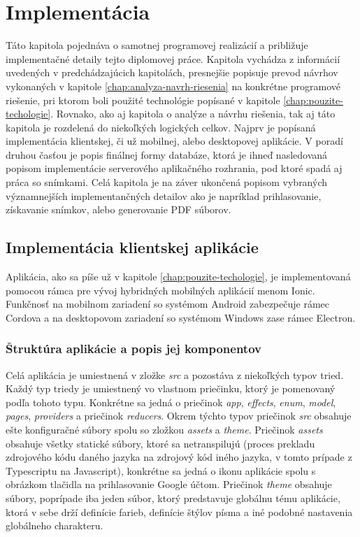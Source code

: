 \chapter{Implementácia}
\label{chap:implementacia}
Táto kapitola pojednáva o samotnej programovej realizácií a približuje implementačné detaily tejto diplomovej práce. Kapitola vychádza z informácií uvedených v predchádzajúcich kapitolách, presnejšie popisuje prevod návrhov vykonaných v kapitole \ref{chap:analyza-navrh-riesenia} na konkrétne programové riešenie, pri ktorom boli použité technológie popísané v kapitole \ref{chap:pouzite-techologie}.  Rovnako, ako aj kapitola o analýze a návrhu riešenia, tak aj táto kapitola je rozdelená do niekoľkých logických celkov. Najprv je popísaná implementácia klientskej, či už mobilnej, alebo desktopovej aplikácie. V poradí druhou časťou je popis finálnej formy databáze, ktorá je ihneď nasledovaná popisom implementácie serverového aplikačného rozhrania, pod ktoré  spadá aj práca so snímkami. Celá kapitola je na záver ukončená popisom vybraných významnejších implementančných detailov ako je napríklad prihlasovanie, získavanie snímkov, alebo generovanie PDF súborov.

\section{Implementácia klientskej aplikácie}
Aplikácia, ako sa píše už v kapitole \ref{chap:pouzite-techologie}, je implementovaná pomocou rámca pre vývoj hybridných mobilných aplikácií menom Ionic. Funkčnosť na mobilnom zariadení so systémom Android zabezpečuje rámec Cordova a na desktopovom zariadení so systémom Windows zase rámec Electron.

\subsection{Štruktúra aplikácie a popis jej komponentov}
Celá aplikácia je umiestnená v zložke \textit{src} a pozostáva z niekoľkých typov tried. Každý typ triedy je umiestnený vo vlastnom priečinku, ktorý je pomenovaný podľa tohoto typu. Konkrétne sa jedná o priečinok \textit{app}, \textit{effects}, \textit{enum}, \textit{model}, \textit{pages}, \textit{providers} a priečinok \textit{reducers}. Okrem týchto typov priečinok \textit{src} obsahuje ešte konfiguračné súbory spolu so zložkou \textit{assets} a \textit{theme}. Priečinok \textit{assets} obsahuje všetky statické súbory, ktoré sa netranspilujú (proces prekladu zdrojového kódu daného jazyka na zdrojový kód iného jazyka, v tomto prípade z Typescriptu na Javascript), konkrétne sa jedná o ikonu aplikácie spolu s obrázkom tlačidla na prihlasovanie Google účtom. Priečinok \textit{theme} obsahuje súbory, poprípade iba jeden súbor, ktorý predstavuje globálnu tému aplikácie, ktorá v sebe drží definície farieb, definície štýlov písma a iné podobné nastavenia globálneho charakteru.

